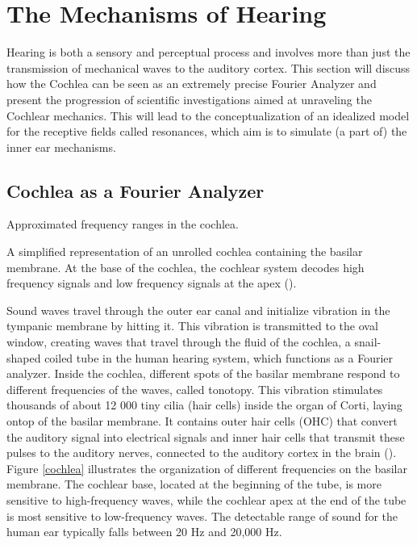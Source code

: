 \chapter{The Mechanisms of Hearing}
\label{chap:cognitiveModel}

Hearing is both a sensory and perceptual process and involves more than just the transmission of mechanical waves to the auditory cortex. This section will discuss how the Cochlea can be seen as an extremely precise Fourier Analyzer and present the progression of scientific investigations aimed at unraveling the Cochlear mechanics. This will lead to the conceptualization of an idealized model for the receptive fields called resonances, which aim is to simulate (a part of) the inner ear mechanisms. 


\section{Cochlea as a Fourier Analyzer}
\begin{marginfigure}
\centering

\vspace{0.5cm}
\caption{Approximated frequency ranges in the cochlea.}
\label{cochlea}  
\vspace{3cm}
\end{marginfigure}

\begin{marginfigure}
\centering

\vspace{0.5cm}
\caption{A simplified representation of an unrolled cochlea containing the basilar membrane. At the base of the cochlea, the cochlear system decodes high frequency signals and low frequency signals at the apex (\cite{kim_mass_2015}).
}
\label{cochleaUnrolled}  
\end{marginfigure}

Sound waves travel through the outer ear canal and initialize vibration in the tympanic
membrane by hitting it. This vibration is transmitted to the oval window, creating waves that travel through the fluid of the cochlea, a snail-shaped coiled tube in the human hearing system, which functions as a Fourier analyzer. Inside the cochlea, different spots of the basilar membrane respond to different frequencies of the waves, called tonotopy. This vibration stimulates thousands of about 12 000 tiny cilia (hair cells) inside the organ of Corti, laying ontop of the basilar membrane. It contains outer hair cells (OHC) that convert the auditory signal into electrical signals and inner hair cells that transmit these pulses to the auditory nerves, connected to the auditory cortex in the brain (\cite{elliott_cochlea_2012, vavakou_frequency_2019}). Figure \ref{cochlea} illustrates the organization of different frequencies on the basilar membrane. The cochlear base, located at the beginning of the tube, is more sensitive to high-frequency waves, while the cochlear apex at the end of the tube is most sensitive to low-frequency waves. The detectable range of sound for the human ear typically falls between 20 Hz and 20,000 Hz.


